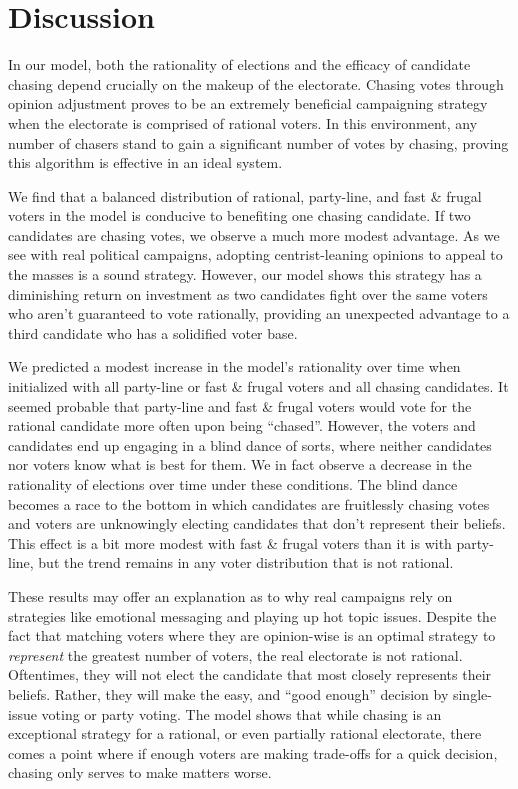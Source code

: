 \section{Discussion}
\label{sec:discussion}

In our model, both the rationality of elections and the efficacy of candidate chasing depend
crucially on the makeup of the electorate. Chasing votes through opinion
adjustment proves to be an extremely beneficial campaigning strategy when the
electorate is comprised of rational voters. In this environment, any number of
chasers stand to gain a significant number of votes by chasing, proving this
algorithm is effective in an ideal system.

We find that a balanced distribution of rational, party-line, and fast \&
frugal voters in the model is conducive to benefiting one chasing candidate. If two
candidates are chasing votes, we observe a much more modest advantage. As we
see with real political campaigns, adopting centrist-leaning opinions to appeal
to the masses is a sound strategy. However, our model shows this strategy has a diminishing
return on investment as two candidates fight over the same voters who aren't
guaranteed to vote rationally, providing an unexpected advantage to a third
candidate who has a solidified voter base.
	
We predicted a modest increase in the model's rationality over time
when initialized with all party-line or fast \& frugal voters and all chasing candidates. It seemed probable
that party-line and fast \& frugal voters would vote for the rational candidate more often
upon being ``chased''. However, the voters and candidates end up engaging in a blind dance
of sorts, where neither candidates nor voters know what is best for them. 
We in fact observe a decrease in the rationality of elections
over time under these conditions. 
The blind dance becomes a race to the bottom in which candidates are
fruitlessly chasing votes and voters are unknowingly electing candidates that
don't represent their beliefs. This effect is a bit more modest with fast \&
frugal voters than it is with party-line, but the trend remains in any voter
distribution that is not rational.

These results may offer an explanation as to why real campaigns rely on strategies like emotional
messaging and playing up hot topic issues. Despite the fact that matching
voters where they are opinion-wise is an optimal strategy to \textit{represent}
the greatest number of voters, the real electorate is not rational. Oftentimes, they
will not elect the candidate that most closely represents their beliefs.
Rather, they will make the easy, and ``good enough'' decision by single-issue
voting or party voting. The model shows that while chasing is an exceptional strategy for a rational, or even partially
rational electorate, there comes a point where if enough voters are making
trade-offs for a quick decision, chasing only serves to make matters worse. 

